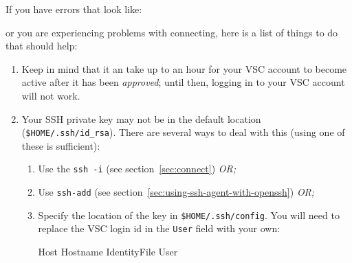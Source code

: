 If you have errors that look like:

\begin{prompt}
\end{prompt}

or you are experiencing problems with connecting, here is a list of things to do
that should help:

\begin{enumerate}
    \item Keep in mind that it an take up to an hour for your VSC account to become
        active after it has been \emph{approved}; until then, logging in to your VSC
        account will not work.
\ifmacORlinux
    \item Your SSH private key may not be in the default location (\verb|$HOME/.ssh/id_rsa|).
        There are several ways to deal with this (using one of these is sufficient):
\begin{enumerate}
            \item Use the \verb|ssh -i| (see section~\ref{sec:connect}) \emph{OR;}
            \item Use \verb|ssh-add| (see section~\ref{sec:using-ssh-agent-with-openssh}) \emph{OR;}
            \item Specify the location of the key in \verb|$HOME/.ssh/config|. You will
                need to replace the VSC login id in the \verb|User| field with your own:

            \begin{prompt}
Host %
    Hostname %
    IdentityFile %
    User %


\end{prompt}
\end{enumerate}
\end{enumerate}
